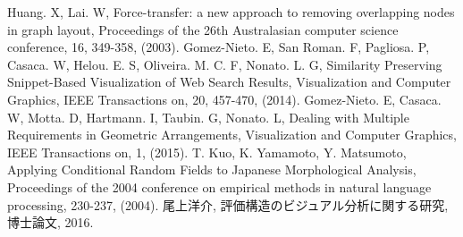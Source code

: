 \documentclass[syuuron]{kuee}
\begin{document}
\begin{thebibliography}{数字}
	 Huang. X, Lai. W, Force-transfer: a new approach to removing overlapping nodes in graph layout, Proceedings of the 26th Australasian computer science conference, 16, 349-358, (2003).
	 Gomez-Nieto. E, San Roman. F, Pagliosa. P, Casaca. W, Helou. E. S, Oliveira. M. C. F, Nonato. L. G, Similarity Preserving Snippet-Based Visualization of Web Search Results, Visualization and Computer Graphics, IEEE Transactions on, 20, 457-470, (2014).
	 Gomez-Nieto. E, Casaca. W, Motta. D, Hartmann. I, Taubin. G, Nonato. L, Dealing with Multiple Requirements in Geometric Arrangements, Visualization and Computer Graphics, IEEE Transactions on, 1, (2015).
	 T. Kuo, K. Yamamoto, Y. Matsumoto, Applying Conditional Random Fields to Japanese Morphological Analysis, Proceedings of the 2004 conference on empirical methods in natural language processing, 230-237, (2004).
	 尾上洋介, 評価構造のビジュアル分析に関する研究,博士論文, 2016.
\end{thebibliography}

\appendix
\end{document}
